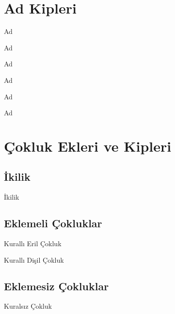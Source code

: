 \section{Ad Kipleri}

\begin{kip}{}{Ad}
\end{kip}

\begin{kip}{}{Ad}
\end{kip}

\begin{kip}{}{Ad}
\end{kip}

\begin{kip}{}{Ad}
\end{kip}

\begin{kip}{}{Ad}
\end{kip}

\begin{kip}{}{Ad}
\end{kip}





\section{Çokluk Ekleri ve Kipleri}

\subsection*{İkilik}
\begin{kip}{}{İkilik}
\end{kip}

\subsection*{Eklemeli Çokluklar}
\begin{kip}{}{Kurallı Eril Çokluk}
\end{kip}

\begin{kip}{}{Kurallı Dişil Çokluk}
\end{kip}

\subsection*{Eklemesiz Çokluklar}
\begin{kip}{}{Kuralsız Çokluk}
\end{kip}

